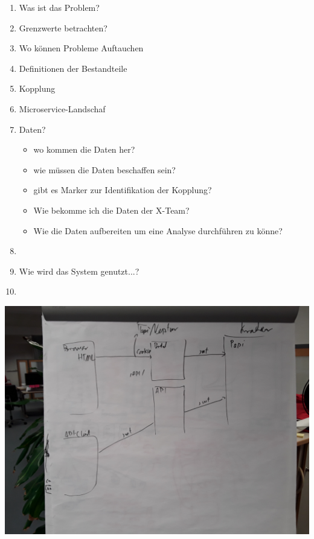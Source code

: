 \documentclass[12pt]{amsart}
\begin{document}
\begin{enumerate}

\item Was ist das Problem?
\item Grenzwerte betrachten?
\item Wo können Probleme Auftauchen
\item Definitionen der Bestandteile 
\item Kopplung
\item Microservice-Landschaf
\item Daten?
\begin{itemize}
    \item wo kommen die Daten her? 
    \item wie müssen die Daten beschaffen sein?
    \item gibt es Marker zur Identifikation der Kopplung?
    \item Wie bekomme ich die Daten der X-Team?
    \item Wie die Daten aufbereiten um eine Analyse durchführen zu könne?
\end{itemize}
\item 
\item Wie wird das System genutzt...?
\item 


\end{enumerate}




\medskip

\newpage

\begin{center}\includegraphics[scale = 0.14]{whith-board _1.jpg}\end{center}
\end{document}
